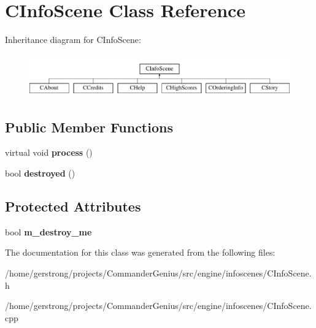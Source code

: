 \hypertarget{class_c_info_scene}{
\section{CInfoScene Class Reference}
\label{class_c_info_scene}
}
Inheritance diagram for CInfoScene:\begin{figure}[H]
\begin{center}
\leavevmode
\includegraphics[height=1.84818cm]{class_c_info_scene}
\end{center}
\end{figure}
\subsection*{Public Member Functions}
\begin{DoxyCompactItemize}
\item 
\hypertarget{class_c_info_scene_a1433f2f0f5755c8ed303ca86369b6506}{
virtual void {\bfseries process} ()}
\label{class_c_info_scene_a1433f2f0f5755c8ed303ca86369b6506}

\item 
\hypertarget{class_c_info_scene_a686b817a354461003e0f93c4409ebe62}{
bool {\bfseries destroyed} ()}
\label{class_c_info_scene_a686b817a354461003e0f93c4409ebe62}

\end{DoxyCompactItemize}
\subsection*{Protected Attributes}
\begin{DoxyCompactItemize}
\item 
\hypertarget{class_c_info_scene_a7a6a93f8b2772714e6267a960c9f2a6a}{
bool {\bfseries m\_\-destroy\_\-me}}
\label{class_c_info_scene_a7a6a93f8b2772714e6267a960c9f2a6a}

\end{DoxyCompactItemize}


The documentation for this class was generated from the following files:\begin{DoxyCompactItemize}
\item 
/home/gerstrong/projects/CommanderGenius/src/engine/infoscenes/CInfoScene.h\item 
/home/gerstrong/projects/CommanderGenius/src/engine/infoscenes/CInfoScene.cpp\end{DoxyCompactItemize}
